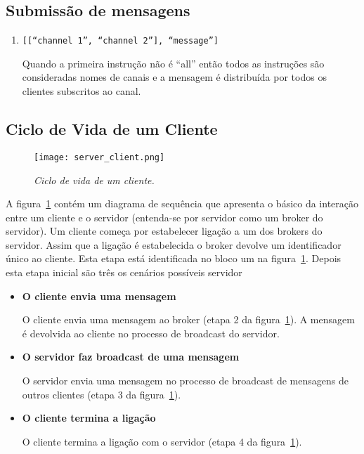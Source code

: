 
\subsection{Submissão de mensagens}
\begin{enumerate}
\item
\texttt{[[``channel 1'', ``channel 2''], ``message'']}

Quando a primeira instrução não é ``all'' então todos as instruções são consideradas nomes de canais e a mensagem é distribuída por todos os clientes subscritos ao canal.

\end{enumerate}


\subsection{Ciclo de Vida de um Cliente}

\begin{figure}[H]
\centering
\texttt{[image: server\_client.png]}
\caption{\textit{Ciclo de vida de um cliente.}}
\label{fig:server-client}
\end{figure}

A figura~\ref{fig:server-client} contém um diagrama de sequência que apresenta o básico da interação entre um cliente e o servidor (entenda-se por servidor como um broker do servidor).
Um cliente começa por estabelecer ligação a um dos brokers do servidor. Assim que a ligação é estabelecida o broker devolve um identificador único ao cliente. Esta etapa está identificada no bloco um na figura~\ref{fig:server-client}. Depois esta etapa inicial são três os cenários possíveis servidor

\begin{itemize}
\item
\textbf{O cliente envia uma mensagem}

O cliente envia uma mensagem ao broker (etapa 2 da figura~\ref{fig:server-client}). A mensagem é devolvida ao cliente no processo de broadcast do servidor.

\item
\textbf{O servidor faz broadcast de uma mensagem}

O servidor envia uma mensagem no processo de broadcast de mensagens de outros clientes (etapa 3 da figura~\ref{fig:server-client}).

\item
\textbf{O cliente termina a ligação}

O cliente termina a ligação com o servidor (etapa 4 da figura~\ref{fig:server-client}).
\end{itemize}
